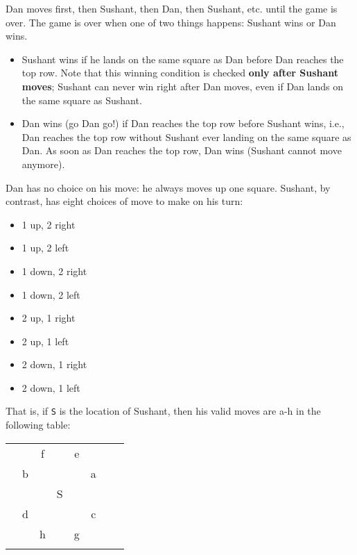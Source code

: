 \documentclass{assignment-263}
\begin{document}
\begin{enumerate}
		Dan moves first, then Sushant, then Dan, then Sushant, etc. until the
		game is over. The game is over when one of two things happens: Sushant
		wins or Dan wins.

		\begin{itemize}
			\item Sushant wins if he lands on the same square as Dan before
				Dan reaches the top row. Note that this winning condition is
				checked {\bf only after Sushant moves}; Sushant can never win
				right after Dan moves, even if Dan lands on the same square
				as Sushant.
			\item Dan wins (go Dan go!) if Dan reaches the top row before
				Sushant wins, i.e., Dan reaches the top row without Sushant ever
				landing on the same square as Dan. As soon as Dan reaches
				the top row, Dan wins (Sushant cannot move anymore).
		\end{itemize}

		Dan has no choice on his move: he always moves up one square.
		 		Sushant, by contrast, has eight choices of move to make on his turn:
		\begin{itemize}
			\item 1 up, 2 right
			\item 1 up, 2 left
			\item 1 down, 2 right
			\item 1 down, 2 left
			\item 2 up, 1 right
			\item 2 up, 1 left
			\item 2 down, 1 right
			\item 2 down, 1 left
		\end{itemize}

		That is, if \verb|S| is the location of Sushant, then his valid moves
		are a-h in the following table:

		\begin{center}
			\begin{tabular}{ | c | c | c | c | c | c | c | c | }
				\hline
				&  &  &  &  &  &  \\ \hline
				&  & f &  & e &  &   \\ \hline
				& b &  &  &  & a &   \\ \hline
				&  &  & S &  &  &   \\ \hline
				& d &  &  &  & c &   \\ \hline
				&  & h &  & g &  &   \\ \hline
				&  &  &  &  &  &   \\ \hline
			\end{tabular}
		\end{center}


\end{enumerate}
\end{document}
